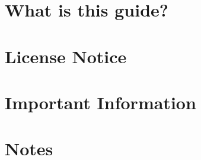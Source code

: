 \documentclass[../main.tex]{subfiles}
\begin{document}
\section*{What is this guide?}
\label{what-is-this-guide}


\section*{License Notice}
\label{license-notice}


\section*{Important Information}
\label{important-information}


\section*{Notes}
\label{notes}

\end{document}
